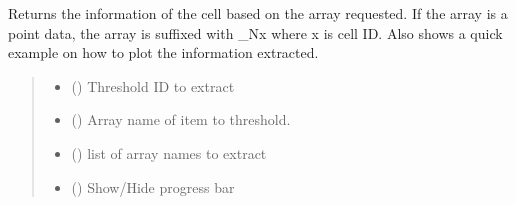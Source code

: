 \documentclass[letterpaper,10pt,english]{sphinxmanual}
\begin{document}
\begin{fulllineitems}
\begin{fulllineitems}
\begin{quote}
\begin{description}
\end{description}\end{quote}

\end{fulllineitems}


\begin{fulllineitems}
\label{\detokenize{pyfdempp:pyfdempp.pyfdempp.Model.extract_threshold_info}}
\pysigstartsignatures
{}
\pysigstopsignatures
\sphinxAtStartPar
Returns the information of the cell based on the array requested.
If the array is a point data, the array is suffixed with \_Nx where x is cell ID.
Also shows a quick example on how to plot the information extracted.
\begin{quote}\begin{description}
\begin{itemize}
\item {} 
\sphinxAtStartPar
{} () \textendash{} Threshold ID to extract

\item {} 
\sphinxAtStartPar
{} () \textendash{} Array name of item to threshold.

\item {} 
\sphinxAtStartPar
{} (\sphinxstyleliteralemphasis{\sphinxupquote{{[}}}\sphinxstyleliteralemphasis{\sphinxupquote{{]}}}) \textendash{} list of array names to extract

\item {} 
\sphinxAtStartPar
{} () \textendash{} Show/Hide progress bar


\end{itemize}
\end{description}
\end{quote}
\end{fulllineitems}
\end{fulllineitems}
\end{document}
